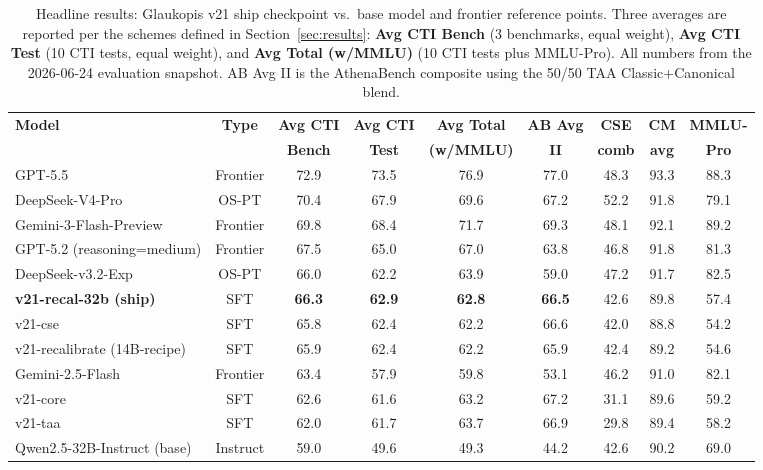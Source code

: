 \documentclass[conference]{IEEEtran}
\begin{document}
\begin{table}[t]
\centering
\caption{Headline results: Glaukopis v21 ship checkpoint vs.\ base model and frontier reference points. Three averages are reported per the schemes defined in Section~\ref{sec:results}: \textbf{Avg CTI Bench} (3 benchmarks, equal weight), \textbf{Avg CTI Test} (10 CTI tests, equal weight), and \textbf{Avg Total (w/MMLU)} (10 CTI tests plus MMLU-Pro). All numbers from the 2026-06-24 evaluation snapshot. AB Avg II is the AthenaBench composite using the 50/50 TAA Classic+Canonical blend.}
\label{tab:results-headline}
\small
\setlength{\tabcolsep}{4pt}
\begin{tabular}{lcccccccc}
\hline
\textbf{Model} & \textbf{Type} & \textbf{Avg CTI} & \textbf{Avg CTI} & \textbf{Avg Total} & \textbf{AB Avg} & \textbf{CSE} & \textbf{CM} & \textbf{MMLU-} \\
               &               & \textbf{Bench}   & \textbf{Test}    & \textbf{(w/MMLU)}  & \textbf{II}    & \textbf{comb} & \textbf{avg} & \textbf{Pro} \\
\hline
GPT-5.5                                  & Frontier  & 72.9 & 73.5 & 76.9 & 77.0 & 48.3 & 93.3 & 88.3 \\
DeepSeek-V4-Pro                          & OS-PT     & 70.4 & 67.9 & 69.6 & 67.2 & 52.2 & 91.8 & 79.1 \\
Gemini-3-Flash-Preview                   & Frontier  & 69.8 & 68.4 & 71.7 & 69.3 & 48.1 & 92.1 & 89.2 \\
GPT-5.2 (reasoning=medium)               & Frontier  & 67.5 & 65.0 & 67.0 & 63.8 & 46.8 & 91.8 & 81.3 \\
DeepSeek-v3.2-Exp                        & OS-PT     & 66.0 & 62.2 & 63.9 & 59.0 & 47.2 & 91.7 & 82.5 \\
\textbf{v21-recal-32b (ship)}            & SFT       & \textbf{66.3} & \textbf{62.9} & \textbf{62.8} & \textbf{66.5} & 42.6 & 89.8 & 57.4 \\
v21-cse                                  & SFT       & 65.8 & 62.4 & 62.2 & 66.6 & 42.0 & 88.8 & 54.2 \\
v21-recalibrate (14B-recipe)             & SFT       & 65.9 & 62.4 & 62.2 & 65.9 & 42.4 & 89.2 & 54.6 \\
Gemini-2.5-Flash                         & Frontier  & 63.4 & 57.9 & 59.8 & 53.1 & 46.2 & 91.0 & 82.1 \\
v21-core                                 & SFT       & 62.6 & 61.6 & 63.2 & 67.2 & 31.1 & 89.6 & 59.2 \\
v21-taa                                  & SFT       & 62.0 & 61.7 & 63.7 & 66.9 & 29.8 & 89.4 & 58.2 \\
Qwen2.5-32B-Instruct (base)              & Instruct  & 59.0 & 49.6 & 49.3 & 44.2 & 42.6 & 90.2 & 69.0 \\
\hline
\end{tabular}
\end{table}
\end{document}
